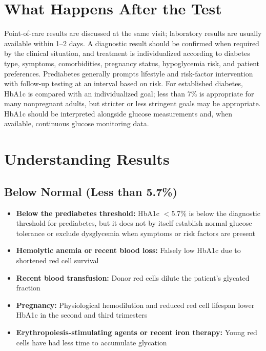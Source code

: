\section*{What Happens After the Test}
Point-of-care results are discussed at the same visit; laboratory results are usually available within 1--2 days. A diagnostic result should be confirmed when required by the clinical situation, and treatment is individualized according to diabetes type, symptoms, comorbidities, pregnancy status, hypoglycemia risk, and patient preferences. Prediabetes generally prompts lifestyle and risk-factor intervention with follow-up testing at an interval based on risk. For established diabetes, HbA1c is compared with an individualized goal; less than 7\% is appropriate for many nonpregnant adults, but stricter or less stringent goals may be appropriate. HbA1c should be interpreted alongside glucose measurements and, when available, continuous glucose monitoring data.

\section*{Understanding Results}

\subsection*{Below Normal (Less than 5.7\%)}
\begin{itemize}
  \item \textbf{Below the prediabetes threshold:} HbA1c $<$5.7\% is below the diagnostic threshold for prediabetes, but it does not by itself establish normal glucose tolerance or exclude dysglycemia when symptoms or risk factors are present
  \item \textbf{Hemolytic anemia or recent blood loss:} Falsely low HbA1c due to shortened red cell survival
  \item \textbf{Recent blood transfusion:} Donor red cells dilute the patient's glycated fraction
  \item \textbf{Pregnancy:} Physiological hemodilution and reduced red cell lifespan lower HbA1c in the second and third trimesters
  \item \textbf{Erythropoiesis-stimulating agents or recent iron therapy:} Young red cells have had less time to accumulate glycation
\end{itemize}

